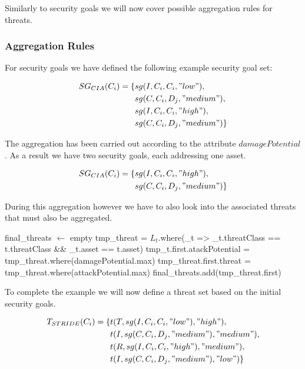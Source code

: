 Similarly to security goals we will now cover possible aggregation rules for threats. 

\subsubsection{Aggregation Rules}
\label{subsubsec:threat_aggregation}

For security goals we have defined the following example security goal set:

\begin{align*}
SG_{CIA}(C_i) = \{&sg(I,C_i,C_i,"low"),\\ &sg(C,C_i,D_j, "medium"),\\ &sg(I,C_i,C_i,"high"),\\ &sg(C,C_i,D_j, "medium")\} \\
\end{align*}

The aggregation has been carried out according to the attribute $damagePotential$. As a result we have two security goals, each addressing one asset.  

\begin{align*}
SG_{CIA}(C_i) = \{&sg(I,C_i,C_i,"high"),\\ &sg(C,C_i,D_j, "medium")\} \\
\end{align*}

During this aggregation however we have to also look into the associated threats that must also be aggregated. 

\begin{algorithm}[H] 
\begin{algorithmic}
\State final\_threats $\gets$ empty
\State tmp\_threat = $L_{t}$.where(\_t => \_t.threatClass == t.threatClass  \&\& \_t.asset == t.asset)
\State tmp\_t.first.atackPotential = tmp\_threat.where(damagePotential.max)
tmp\_threat.first.threat = tmp\_threat.where(attackPotential.max)
\State final\_threats.add(tmp\_threat.first)
\EndFor
\EndFunction
\end{algorithmic}
\end{algorithm}

To complete the example we will now define a threat set based on the initial security goals.

\begin{align*}
T_{STRIDE}(C_i) = \{&t(T, sg(I,C_i,C_i,"low"), "high"),\\ 
&t(I, sg(C,C_i,D_j, "medium"), "medium"),\\ 
&t(R, sg(I,C_i,C_i,"high"), "medium"),\\ 
&t(I, sg(C,C_i,D_j, "medium"), "low")\}
\end{align*}

